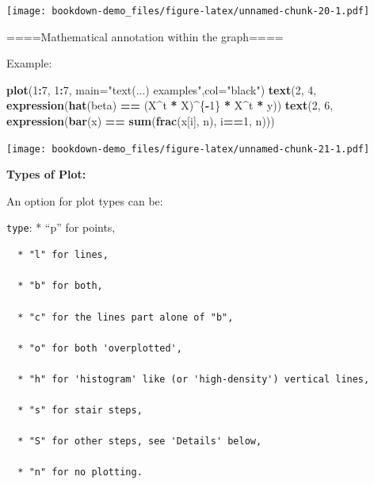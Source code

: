 \documentclass[]{book}
\newenvironment{Shaded}{\begin{snugshade}}{\end{snugshade}}
\newcommand{\KeywordTok}[1]{\textcolor[rgb]{0.13,0.29,0.53}{\textbf{#1}}}
\newcommand{\DataTypeTok}[1]{\textcolor[rgb]{0.13,0.29,0.53}{#1}}
\newcommand{\DecValTok}[1]{\textcolor[rgb]{0.00,0.00,0.81}{#1}}
\newcommand{\StringTok}[1]{\textcolor[rgb]{0.31,0.60,0.02}{#1}}
\newcommand{\OperatorTok}[1]{\textcolor[rgb]{0.81,0.36,0.00}{\textbf{#1}}}
\newcommand{\NormalTok}[1]{#1}
\begin{document}
\texttt{[image: bookdown-demo\_files/figure-latex/unnamed-chunk-20-1.pdf]}

====Mathematical annotation within the graph====

Example:

\begin{Shaded}
\begin{Highlighting}[]
\KeywordTok{plot}\NormalTok{(}\DecValTok{1}\OperatorTok{:}\DecValTok{7}\NormalTok{, }\DecValTok{1}\OperatorTok{:}\DecValTok{7}\NormalTok{, }
     \DataTypeTok{main=}\StringTok{"text(...) examples"}\NormalTok{,}\DataTypeTok{col=}\StringTok{"black"}\NormalTok{)}
\KeywordTok{text}\NormalTok{(}\DecValTok{2}\NormalTok{, }\DecValTok{4}\NormalTok{, }\KeywordTok{expression}\NormalTok{(}\KeywordTok{hat}\NormalTok{(beta) }\OperatorTok{==}\StringTok{ }\NormalTok{(X}\OperatorTok{^}\NormalTok{t }\OperatorTok{*}\StringTok{ }\NormalTok{X)}\OperatorTok{^}\NormalTok{\{}\OperatorTok{-}\DecValTok{1}\NormalTok{\} }\OperatorTok{*}\StringTok{ }\NormalTok{X}\OperatorTok{^}\NormalTok{t }\OperatorTok{*}\StringTok{ }\NormalTok{y))}
\KeywordTok{text}\NormalTok{(}\DecValTok{2}\NormalTok{, }\DecValTok{6}\NormalTok{, }\KeywordTok{expression}\NormalTok{(}\KeywordTok{bar}\NormalTok{(x) }\OperatorTok{==}\StringTok{ }\KeywordTok{sum}\NormalTok{(}\KeywordTok{frac}\NormalTok{(x[i], n), i}\OperatorTok{==}\DecValTok{1}\NormalTok{, n)))}
\end{Highlighting}
\end{Shaded}

\texttt{[image: bookdown-demo\_files/figure-latex/unnamed-chunk-21-1.pdf]}

\textbf{Types of Plot: }

An option for plot types can be:

\texttt{type}: * ``p'' for points,

\begin{verbatim}
  * "l" for lines,

  * "b" for both,

  * "c" for the lines part alone of "b",

  * "o" for both 'overplotted',

  * "h" for 'histogram' like (or 'high-density') vertical lines,

  * "s" for stair steps,

  * "S" for other steps, see 'Details' below,

  * "n" for no plotting.
\end{verbatim}
\end{document}
